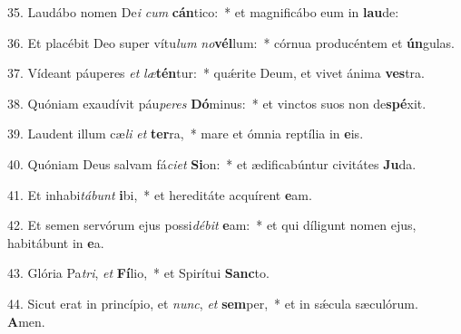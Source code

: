 35. Laudábo nomen De\textit{i} \textit{cum} \textbf{cán}tico:~*  et magnificábo eum in \textbf{lau}de:\

36. Et placébit Deo super vítu\textit{lum} \textit{no}\textbf{vél}lum:~*  córnua producéntem et \textbf{ún}gulas.\

37. Vídeant páuperes \textit{et} \textit{læ}\textbf{tén}tur:~*  quǽrite Deum, et vivet ánima \textbf{ves}tra.\

38. Quóniam exaudívit páu\textit{pe}\textit{res} \textbf{Dó}minus:~*  et vinctos suos non de\textbf{spé}xit.\

39. Laudent illum cæ\textit{li} \textit{et} \textbf{ter}ra,~*  mare et ómnia reptília in \textbf{e}is.\

40. Quóniam Deus salvam fá\textit{ci}\textit{et} \textbf{Si}on:~*  et ædificabúntur civitátes \textbf{Ju}da.\

41. Et inhabi\textit{tá}\textit{bunt} \textbf{i}bi,~*  et hereditáte acquírent \textbf{e}am.\

42. Et semen servórum ejus possi\textit{dé}\textit{bit} \textbf{e}am:~*  et qui díligunt nomen ejus, habitábunt in \textbf{e}a.\

43. Glória Pa\textit{tri}, \textit{et} \textbf{Fí}lio,~*  et Spirítui \textbf{Sanc}to.\

44. Sicut erat in princípio, et \textit{nunc}, \textit{et} \textbf{sem}per,~*  et in sǽcula sæculórum. \textbf{A}men.\

